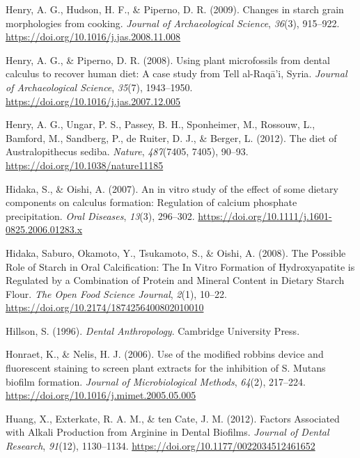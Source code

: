 \documentclass[
  letterpaper,
]{book}
\newlength{\cslhangindent}
\newlength{\cslentryspacingunit} %
\newenvironment{CSLReferences}[2] %
 {%
  \setlength{\parindent}{0pt}
  \ifodd #1
  \let\oldpar\par
  \def\par{\hangindent=\cslhangindent\oldpar}
  \fi
  \setlength{\parskip}{#2\cslentryspacingunit}
 }%
 {}
\begin{document}
\begin{CSLReferences}{1}{0}
\leavevmode{}%
Henry, A. G., Hudson, H. F., \& Piperno, D. R. (2009). Changes in starch
grain morphologies from cooking. \emph{Journal of Archaeological
Science}, \emph{36}(3), 915--922.
\url{https://doi.org/10.1016/j.jas.2008.11.008}

\leavevmode{}%
Henry, A. G., \& Piperno, D. R. (2008). Using plant microfossils from
dental calculus to recover human diet: A case study from {Tell}
al-{Raqā}'i, {Syria}. \emph{Journal of Archaeological Science},
\emph{35}(7), 1943--1950.
\url{https://doi.org/10.1016/j.jas.2007.12.005}

\leavevmode{}%
Henry, A. G., Ungar, P. S., Passey, B. H., Sponheimer, M., Rossouw, L.,
Bamford, M., Sandberg, P., de Ruiter, D. J., \& Berger, L. (2012). The
diet of {Australopithecus} sediba. \emph{Nature}, \emph{487}(7405,
7405), 90--93. \url{https://doi.org/10.1038/nature11185}

\leavevmode{}%
Hidaka, S., \& Oishi, A. (2007). An in vitro study of the effect of some
dietary components on calculus formation: Regulation of calcium
phosphate precipitation. \emph{Oral Diseases}, \emph{13}(3), 296--302.
\url{https://doi.org/10.1111/j.1601-0825.2006.01283.x}

\leavevmode{}%
Hidaka, Saburo, Okamoto, Y., Tsukamoto, S., \& Oishi, A. (2008). The
{Possible Role} of {Starch} in {Oral Calcification}: {The In Vitro
Formation} of {Hydroxyapatite} is {Regulated} by a {Combination} of
{Protein} and {Mineral Content} in {Dietary Starch Flour}. \emph{The
Open Food Science Journal}, \emph{2}(1), 10--22.
\url{https://doi.org/10.2174/1874256400802010010}

\leavevmode{}%
Hillson, S. (1996). \emph{Dental {Anthropology}}. {Cambridge University
Press}.

\leavevmode{}%
Honraet, K., \& Nelis, H. J. (2006). Use of the modified robbins device
and fluorescent staining to screen plant extracts for the inhibition of
{S}. Mutans biofilm formation. \emph{Journal of Microbiological
Methods}, \emph{64}(2), 217--224.
\url{https://doi.org/10.1016/j.mimet.2005.05.005}

\leavevmode{}%
Huang, X., Exterkate, R. A. M., \& ten Cate, J. M. (2012). Factors
{Associated} with {Alkali Production} from {Arginine} in {Dental
Biofilms}. \emph{Journal of Dental Research}, \emph{91}(12), 1130--1134.
\url{https://doi.org/10.1177/0022034512461652}


\end{CSLReferences}
\end{document}
